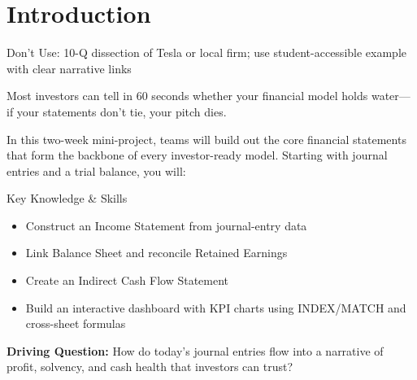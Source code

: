 
\section{Introduction}
\begin{Replace}
Don't Use: 10-Q dissection of Tesla or local firm; use student-accessible example with clear narrative links
\end{Replace}

\begin{Trivia}
Most investors can tell in 60 seconds whether your financial model holds water—if your statements don’t tie, your pitch dies.
\end{Trivia}

In this two-week mini-project, teams will build out the core financial statements that form the backbone of every investor-ready model. Starting with journal entries and a trial balance, you will:

\begin{skillbox}{Key Knowledge \& Skills}
\begin{itemize}
  \item Construct an Income Statement from journal-entry data
  \item Link Balance Sheet and reconcile Retained Earnings
  \item Create an Indirect Cash Flow Statement
  \item Build an interactive dashboard with KPI charts using INDEX/MATCH and cross-sheet formulas
\end{itemize}
\end{skillbox}

\begin{Important}
\textbf{Driving Question:} How do today’s journal entries flow into a narrative of profit, solvency, and cash health that investors can trust?
\end{Important}


\clearpage
